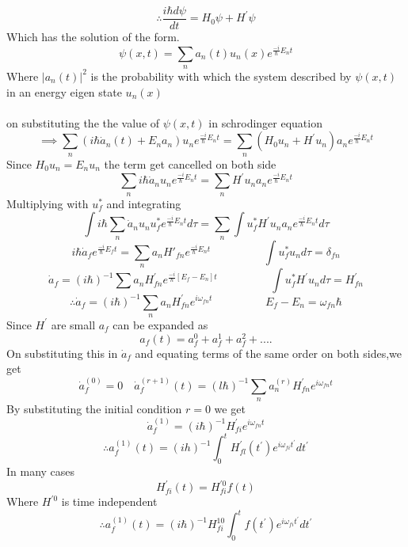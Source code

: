 $$\therefore\frac{i\hbar d \psi}{dt}=H_0\psi+H^\prime\psi$$
Which has the solution of the form.
$$\psi(x,t)=\sum_{n}a_n(t)u_n(x)e^{\frac{-i}{\hbar }E_nt}$$
Where $|a_n(t)|^2$ is the probability with which the system described by $\psi(x,t)$ in an energy eigen state $u_n(x)$\\\\
on substituting the the value of $\psi(x,t)$ in schrodinger equation 
$$\implies\sum_{n}(i\hbar \dot{a}_n(t)+E_na_n)u_n e^{\frac{-i}{\hbar} E_nt}=\sum_{n}(H_0u_n+H^\prime u_n)a_ne^{\frac{-i}{\hbar}E_nt}$$
Since $H_0u_n=E_nu_n$ the term get cancelled on both side\\
$$\sum_{n}i\hbar\dot{a}_nu_ne^{\frac{-i}{\hbar}E_nt}=\sum_{n}H^\prime u_n a_n e^{\frac{-i}{\hbar}E_nt}$$
Multiplying with $u_f^*$ and integrating\\
$$ \int i\hbar \sum_{n} \dot{a}_n u_n u_f^* e^{\frac{-i}{\hbar}E_nt}d\tau=\sum_{n}\int u_f^*H^\prime u_na_ne^{\frac{-i}{\hbar}E_nt}d\tau$$
$$ i\hbar{\dot{a}}_f e^{\frac{-i}{\hbar}E_ft}=\sum_{n}a_n {H\prime} _{fn} e^{\frac{-i}{\hbar}E_nt}\hspace{2cm}
\int u_f^* u_n d\tau=\delta_{fn}$$
$$ \dot{a}_f =(i\hbar)^{-1}\sum a_n H^\prime_{fn}e^{\frac{-i}{\hbar}[E_f-E_n]t}\hspace{2cm}\int u_f^* H^\prime u_n d\tau=H^\prime_{fn}$$
$$\therefore \dot{a}_f=(i\hbar)^{-1}\sum_n a_n H^\prime_{fn}e^{i\omega_{fn}t}\hspace{2cm}E_f-E_n=\omega_{fn}\hbar
$$
Since $H^\prime$ are small $a_f$ can be expanded as \\
$$a_f(t)=a_f^0+a_f^1+a_f^2+....$$
On substituting this in $\dot{a}_f$ and equating terms of the same order on both sides,we get
$$\dot{a}_f^{(0)}=0\quad \dot{a}_f^{(r+1)}(t)=(l\hbar)^{-1}\sum_n
a_n^{(r)}H_{fn}^\prime e^{i\omega_{fn}t}$$
By substituting the initial condition $r=0$ we get
$$\dot{a}_f^{(1)}=(i\hbar)^{-1}H^{\prime}_{fi}e^{i\omega_{fn}t}$$
$$\therefore a_f^{(1)}(t)=(ih)^{-1}\int_{0}^{t}H^\prime_{fl}(t^\prime)e^{i\omega_{fi}t^{\prime}}dt^\prime$$
In many cases\\
$$H^\prime _{fi}(t)=H_{fi}^{\prime 0}f(t)$$
Where $H^{\prime 0}$ is time independent\\
$$\therefore a_f^{(1)}(t)=(i\hbar)^{-1}H^{10}_{fi}\int_{0}^{t}f(t^\prime)e^{i\omega_{fi}t^{\prime}}dt^\prime$$
